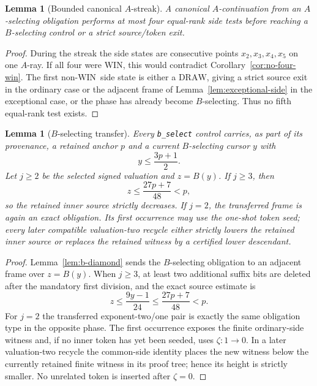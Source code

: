 \documentclass[11pt]{article}
\newtheorem{lemma}[theorem]{Lemma}
\newcommand{\WIN}{\ensuremath{\mathrm{WIN}}}
\newcommand{\DRAW}{\ensuremath{\mathrm{DRAW}}}
\begin{document}
\begin{lemma}[Bounded canonical $A$-streak]\label{lem:a-streak}
A canonical $A$-continuation from an $A$-selecting obligation performs at
most four equal-rank side tests before reaching a $B$-selecting control or a
strict source/token exit.
\end{lemma}

\begin{proof}
During the streak the side states are consecutive points
$x_2,x_3,x_4,x_5$ on one $A$-ray. If all four were \WIN, this would contradict
Corollary~\ref{cor:no-four-win}. The first non-\WIN\ side state is either a
\DRAW, giving a strict source exit in the ordinary case or the adjacent frame of
Lemma~\ref{lem:exceptional-side} in the exceptional case, or the phase has already become
$B$-selecting. Thus no fifth equal-rank test exists.
\end{proof}

\begin{lemma}[$B$-selecting transfer]\label{lem:b-routing}
Every \texttt{b\_select} control carries, as part of its provenance, a retained
anchor $p$ and a current $B$-selecting cursor $y$ with
\[
  y\le\frac{3p+1}{2}.
\]
Let $j\ge2$ be the selected signed valuation and $z=B(y)$. If $j\ge3$, then
\[
  z\le\frac{27p+7}{48}<p,
\]
so the retained inner source strictly decreases. If $j=2$, the transferred
frame is again an exact obligation. Its first occurrence may use the one-shot
token seed; every later compatible valuation-two recycle either strictly
lowers the retained inner source or replaces the retained witness by a
certified lower descendant.
\end{lemma}

\begin{proof}
Lemma~\ref{lem:b-diamond} sends the $B$-selecting obligation to an adjacent frame over $z=B(y)$. When $j\ge3$, at least two additional suffix
bits are deleted after the mandatory first division, and the exact source
estimate is
\[
 z\le\frac{9y-1}{24}
   \le\frac{27p+7}{48}<p.
\]
For $j=2$ the transferred exponent-two/one pair is exactly the same
obligation type in the opposite phase. The first occurrence exposes the
finite ordinary-side witness and, if no inner token has yet been seeded,
uses $\zeta:1\to0$. In a later valuation-two recycle the common-side identity
places the new witness below the currently retained finite witness in its
proof tree; hence its height is strictly smaller. No unrelated token is
inserted after $\zeta=0$.
\end{proof}
\end{document}
